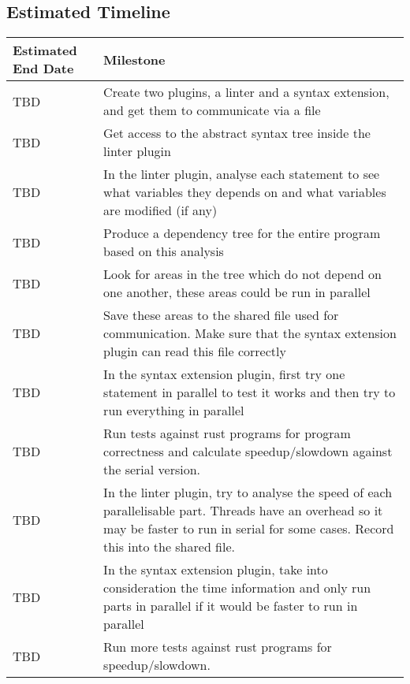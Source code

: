 \documentclass[12pt, a4paper]{article}
\begin{document}
\subsection{Estimated Timeline}
\begin{tabularx}{\textwidth}{ | >{\hsize=0.15\hsize}X | >{\hsize=0.85\hsize}X |}
	\hline
	\textbf{Estimated End Date} & \textbf{Milestone} \\
	\hline
	TBD & Create two plugins, a linter and a syntax extension, and get them to communicate via a file \\
	\hline
	TBD & Get access to the abstract syntax tree inside the linter plugin \\
	\hline
	TBD & In the linter plugin, analyse each statement to see what variables they depends on and what variables are modified (if any) \\
	\hline
	TBD & Produce a dependency tree for the entire program based on this analysis \\
	\hline
	TBD & Look for areas in the tree which do not depend on one another, these areas could be run in parallel \\
	\hline
	TBD & Save these areas to the shared file used for communication. Make sure that the syntax extension plugin can read this file correctly \\
	\hline
	TBD & In the syntax extension plugin, first try one statement in parallel to test it works and then try to run everything in parallel \\
	\hline
	TBD & Run tests against rust programs for program correctness and calculate speedup/slowdown against the serial version. \\
	\hline
	TBD & In the linter plugin, try to analyse the speed of each parallelisable part. Threads have an overhead so it may be faster to run in serial for some cases. Record this into the shared file. \\
	\hline
	TBD & In the syntax extension plugin, take into consideration the time information and only run parts in parallel if it would be faster to run in parallel \\
	\hline
	TBD & Run more tests against rust programs for speedup/slowdown. \\
	\hline
\end{tabularx}
\end{document}
